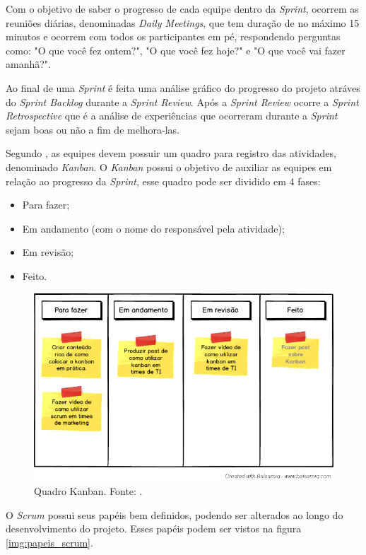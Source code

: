 Com o objetivo de saber o progresso de cada equipe dentro da \textit{Sprint}, ocorrem as reuniões diárias, denominadas \textit{Daily Meetings}, que tem duração de no máximo 15 minutos e ocorrem com todos os participantes em pé, respondendo perguntas como: "O que você fez ontem?", "O que você fez hoje?" e "O que você vai fazer amanhã?". 

Ao final de uma \textit{Sprint} é feita uma análise gráfico do progresso do projeto atráves do \textit{Sprint Backlog} durante a \textit{Sprint Review}. Após a \textit{Sprint Review} ocorre a \textit{Sprint Retrospective} que é a análise de experiências que ocorreram durante a \textit{Sprint} sejam boas ou não a fim de melhora-las.

Segundo , as equipes devem possuir um quadro para registro das atividades, denominado \textit{Kanban}. O \textit{Kanban} possui o objetivo de auxiliar as equipes em relação ao progresso da \textit{Sprint}, esse quadro pode ser dividido em 4 fases:

\begin{itemize}
	\item Para fazer;
	\item Em andamento (com o nome do responsável pela atividade);
	\item Em revisão;
	\item Feito.
\end{itemize}

\begin{figure}[H]
	\centering
	\includegraphics[width=1.0\textwidth]{figuras/kanban.png}
	\caption{Quadro Kanban. Fonte: .}
	\label{img:kanban}
\end{figure}

O \textit{Scrum} possui seus papéis bem definidos, podendo ser alterados ao longo do desenvolvimento do projeto. Esses papéis podem ser vistos na figura \ref{img:papeis_scrum}.

